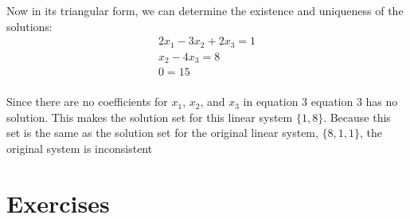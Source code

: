 \documentclass[12pt letter]{report}
\begin{document}
{{    Now in its triangular form, we can determine the existence and uniqueness of the solutions:
    \begin{align*}
      2x_1 - 3x_2 + 2x_3 = 1 \\
      x_2 - 4x_3 = 8         \\
      0 = 15                 \\
    \end{align*}

    Since there are no coefficients for $x_1$, $x_2$, and $x_3$ in equation 3 equation 3 has no solution. This makes the
    solution set for this linear system $\{1, 8\}$. Because this set is the same as the solution set for the original
    linear system, $\{8, 1, 1\} $, the original system is inconsistent


  }
}



\section{Exercises}


\end{document}
